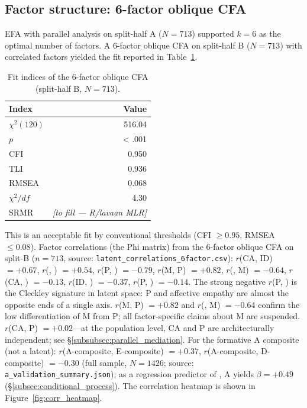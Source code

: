\subsection{Factor structure: 6-factor oblique CFA}

EFA with parallel analysis on split-half A ($N = 713$) supported $k = 6$ as the optimal number of factors. A 6-factor oblique CFA on split-half B ($N = 713$) with correlated factors yielded the fit reported in Table~\ref{tab:cfa_fit}.

\begin{table}[htbp]
\centering
\caption{Fit indices of the 6-factor oblique CFA (split-half B, $N = 713$).}
\label{tab:cfa_fit}
\begin{tabular}{lr}
\toprule
Index & Value \\
\midrule
$\chi^2(120)$ & 516.04 \\
$p$ & < .001 \\
CFI & 0.950 \\
TLI & 0.936 \\
RMSEA & 0.068 \\
$\chi^2 / df$ & 4.30 \\
SRMR & \textit{[to fill --- R/lavaan MLR]} \\
\bottomrule
\end{tabular}
\end{table}

This is an acceptable fit by conventional thresholds (CFI $\geq 0.95$, RMSEA $\leq 0.08$). Factor correlations (the Phi matrix) from the 6-factor oblique CFA on split-B ($n = 713$, source: \texttt{latent\_correlations\_6factor.csv}): $r$(CA, ID) $= +0.67$, $r$(\EAF, \Ecog) $= +0.54$, $r$(P, \EAF) $= \mathbf{-0.79}$, $r$(M, P) $= \mathbf{+0.82}$, $r$(\EAF, M) $= -0.64$, $r$(CA, \EAF) $= -0.13$, $r$(ID, \EAF) $= -0.37$, $r$(P, \Ecog) $= -0.14$. The strong negative $r$(P, \EAF) is the Cleckley signature in latent space: P and affective empathy are almost the opposite ends of a single axis. $r$(M, P) $= +0.82$ and $r$(\EAF, M) $= -0.64$ confirm the low differentiation of M from P; all factor-specific claims about M are suspended. $r$(CA, P) $= +0.02$---at the population level, CA and P are architecturally independent; see §\ref{subsubsec:parallel_mediation}. For the formative A composite (not a latent): $r$(A-composite, E-composite) $= +0.37$, $r$(A-composite, D-composite) $= -0.30$ (full sample, $N=1426$; source: \texttt{a\_validation\_summary.json}); as a regression predictor of \EAF{}, A yields $\beta = +0.49$ (§\ref{subsec:conditional_process}). The correlation heatmap is shown in Figure~\ref{fig:corr_heatmap}.

